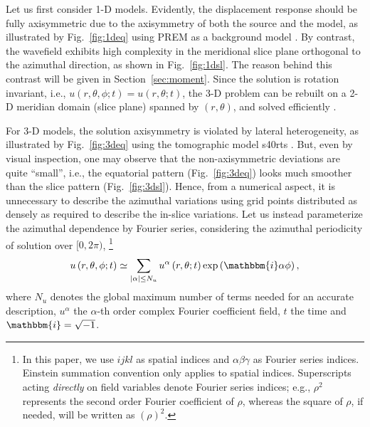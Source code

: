 \documentclass[extra]{gji}
\begin{document}
Let us first consider 1-D models. Evidently, the displacement response 
should be fully axisymmetric due to the axisymmetry of both the source 
and the model, as illustrated by Fig.~\ref{fig:1deq} using PREM as a 
background model \cite[]{dziewonski1981prem}.
By contrast, the wavefield exhibits high complexity in the meridional 
slice plane orthogonal to the azimuthal direction, as shown in Fig.~\ref{fig:1dsl}. 
The reason behind this contrast will be given in Section~\ref{sec:moment}.
Since the solution is rotation invariant, i.e., 
$u\left(r,\theta,\phi; t\right)=u\left(r,\theta; t\right)$, 
the 3-D problem can be rebuilt on a 2-D meridian domain (slice plane)
spanned by $\left(r,\theta\right)$, 
and solved efficiently \cite[]{nissen2014axisem}. 

For 3-D models, the solution axisymmetry is violated by lateral 
heterogeneity, as illustrated by Fig.~\ref{fig:3deq}
using the tomographic model s40rts 
\cite[]{ritsema2011s40rts}. But, even by visual inspection, 
one may observe that the non-axisymmetric deviations are quite ``small'', 
i.e., the equatorial pattern (Fig.~\ref{fig:3deq}) looks much smoother 
than the slice pattern (Fig.~\ref{fig:3dsl}). 
Hence, from a numerical aspect, it is unnecessary to describe the azimuthal 
variations using grid points distributed as densely as required to 
describe the in-slice variations. Let us instead parameterize 
the azimuthal dependence by Fourier series, considering the azimuthal
periodicity of solution over $[0,2\pi)$, %
\footnote{In this paper, we use $ijkl$ as spatial indices and 
$\alpha\beta\gamma$ as Fourier series indices. Einstein summation convention only 
applies to spatial indices. Superscripts acting \textit{directly} on 
field variables denote Fourier series indices; e.g., $\rho^2$ represents the 
second order Fourier coefficient of $\rho$, whereas the square of $\rho$, if
needed, will be written as $\left(\rho\right)^2$.}
\begin{equation}  
  u\left(r,\theta,\phi;t\right) \simeq \sum_{|\alpha| \le N_u} 
  u^\alpha\left(r,\theta;t\right)\exp\left(\mathbbm{i}\alpha\phi\right),
  \label{eq:demo}
\end{equation}
where $N_u$ denotes the global maximum number of terms needed for an accurate 
description, $u^\alpha$ the $\alpha$-th order complex Fourier coefficient 
field, $t$ the time and $\mathbbm{i}=\sqrt{-1}$. 
\end{document}
